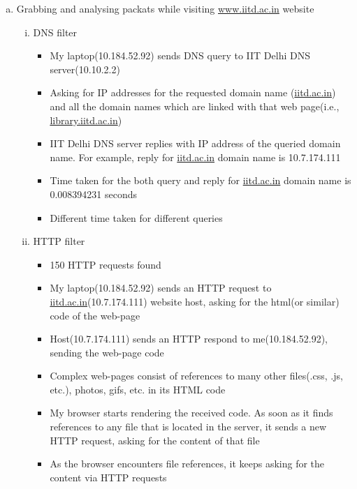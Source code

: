 \documentclass{article}
\begin{document}
    \begin{enumerate}[a)]
        \item Grabbing and analysing packats while visiting \href{www.iitd.ac.in}{www.iitd.ac.in} website
            \begin{enumerate}[i)]
                \item DNS filter
                    \begin{itemize}
                        \item My laptop(10.184.52.92) sends DNS query to IIT Delhi DNS server(10.10.2.2)
                        \item Asking for IP addresses for the requested domain name (\href{www.iitd.ac.in}{iitd.ac.in}) and all the domain names which are linked with that web page(i.e., \href{www.library.iitd.ac.in}{library.iitd.ac.in})
                        \item IIT Delhi DNS server replies with IP address of the queried domain name. For example, reply for \href{www.iitd.ac.in}{iitd.ac.in} domain name is 10.7.174.111
                        \item Time taken for the both query and reply for \href{www.iitd.ac.in}{iitd.ac.in} domain name is 0.008394231 seconds
                        \item Different time taken for different queries
                    \end{itemize}{}
                \item HTTP filter
                    \begin{itemize}
                        \item 150 HTTP requests found
                        \item My laptop(10.184.52.92) sends an HTTP request to \href{www.iitd.ac.in}{iitd.ac.in}(10.7.174.111) website host, asking for the html(or similar) code of the web-page
                        \item Host(10.7.174.111) sends an HTTP respond to me(10.184.52.92), sending the web-page code
                        \item Complex web-pages consist of references to many other files(.css, .js, etc.), photos, gifs,  etc. in its HTML code
                        \item My browser starts rendering the received code. As soon as it finds references to any file that is located in the server, it sends a new HTTP request, asking for the content of that file
                        \item As the browser encounters file references, it keeps asking for the content via HTTP requests
                    \end{itemize}{}
            \end{enumerate}{}
    \end{enumerate}
\end{document}
